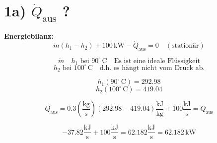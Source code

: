 \section*{1a) $\dot{Q}_{\text{aus}}$ ?}

\textbf{Energiebilanz:} \\
\[
\dot{m} (h_1 - h_2) + 100 \, \text{kW} - \dot{Q}_{\text{aus}} = 0 \quad (\text{stationär})
\]

\[
\dot{m} \quad h_1 \text{ bei } 90^\circ \, \text{C} \quad \text{Es ist eine ideale Flüssigkeit}
\]
\[
h_2 \text{ bei } 100^\circ \, \text{C} \quad \text{d.h. es hängt nicht vom Druck ab.}
\]

\[
h_1 (90^\circ \, \text{C}) = 292.98
\]
\[
h_2 (100^\circ \, \text{C}) = 419.04
\]

\[
\dot{Q}_{\text{aus}} = 0.3 \left( \frac{\text{kg}}{\text{s}} \right) \left( 292.98 - 419.04 \right) \frac{\text{kJ}}{\text{kg}} + 100 \frac{\text{kJ}}{\text{s}} = \dot{Q}_{\text{aus}}
\]

\[
-37.82 \frac{\text{kJ}}{\text{s}} + 100 \frac{\text{kJ}}{\text{s}} = 62.182 \frac{\text{kJ}}{\text{s}} = 62.182 \, \text{kW}
\]
